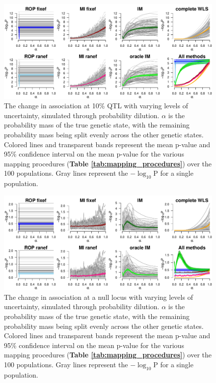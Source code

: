 \begin{figure}
\centering
\renewcommand{\familydefault}{\sfdefault}\normalfont
\includegraphics[width=\textwidth]{figures/4-mi/CC_pvalue_fluct_qtl_mean_dilution.pdf}
\caption[Effect of uncertainty modeled through probability dilution sampling on association at QTL in simulated data]{The change in association at 10\% QTL with varying levels of uncertainty, simulated through probability dilution. $\alpha$ is the probability mass of the true genetic state, with the remaining probability mass being split evenly across the other genetic states. Colored lines and transparent bands represent the mean p-value and 95\% confidence interval on the mean p-value for the various mapping procedures (\textbf{Table \ref{tab:mapping_procedures}}) over the 100 populations. Gray lines represent the $-\log_{10}\text{P}$ for a single population.\label{fig:multi_pval_dilution_qtl}}
\end{figure}

\begin{figure}
\includegraphics[width=\textwidth]{figures/4-mi/CC_pvalue_fluct_null_mean_dilution.pdf}
\caption[Effect of uncertainty modeled through probability dilution sampling on association at null locus in simulated data]{The change in association at a null locus with varying levels of uncertainty, simulated through probability dilution. $\alpha$ is the probability mass of the true genetic state, with the remaining probability mass being split evenly across the other genetic states. Colored lines and transparent bands represent the mean p-value and 95\% confidence interval on the mean p-value for the various mapping procedures (\textbf{Table \ref{tab:mapping_procedures}}) over the 100 populations. Gray lines represent the $-\log_{10}\text{P}$ for a single population.\label{fig:multi_pval_dilution_null}}
\end{figure}



